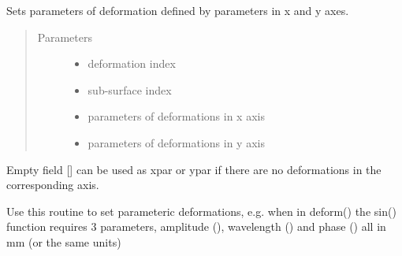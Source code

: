 \documentclass[letterpaper,10pt,english]{sphinxmanual}
\begin{document}
\begin{fulllineitems}
\label{\detokenize{xsrt_functions:xsrt.defparxy}}
Sets parameters of deformation defined by parameters in x and y axes.
\begin{quote}\begin{description}
\item[{Parameters}] \leavevmode\begin{itemize}
\item {} 
 \textendash{} deformation index

\item {} 
 \textendash{} sub-surface index

\item {} 
 \textendash{} parameters of deformations in x axis

\item {} 
 \textendash{} parameters of deformations in y axis

\end{itemize}

\end{description}\end{quote}

Empty field {[}{]} can be used as xpar or ypar if there are no deformations
in the corresponding axis.

Use this routine to set parameteric deformations, e.g.
when  in deform() the sin() function requires 3 parameters,
amplitude (), wavelength () and phase () all in mm
(or the same units) 

\end{fulllineitems}

\end{document}
